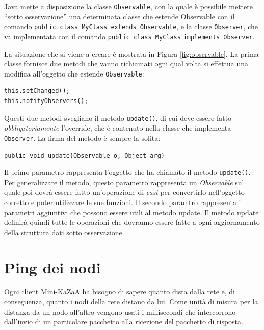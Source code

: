 Java mette a disposizione la classe \verb|Observable|,%
con la quale è possibile mettere ``sotto osservazione'' una determinata classe che estende Observable con il comando \verb|public class MyClass extends Observable|, e la classe \verb|Observer|, che va implementata con il comando \verb|public class MyClass| \verb|implements Observer|.

La situazione che si viene a creare è mostrata in Figura \ref{fig:observable}.
La prima classe fornisce due metodi che vanno richiamati ogni qual volta si effettua una modifica all'oggetto che estende \verb|Observable|:
\begin{lstlisting}
this.setChanged();
this.notifyObservers();
\end{lstlisting}
Questi due metodi svegliano il metodo \verb|update()|, di cui deve essere fatto \emph{obbligatoriamente} l'override, che è contenuto nella classe che implementa \verb|Observer|.
La firma del metodo è sempre la solita:
\begin{lstlisting}
public void update(Observable o, Object arg)
\end{lstlisting}
Il primo parametro rappresenta l'oggetto che ha chiamato il metodo \verb|update()|. Per generalizzare il metodo,
questo parametro rappresenta un \emph{Observable} sul quale poi dovrà essere fatto un'operazione di \emph{cast}
per convertirlo nell'oggetto corretto e poter utilizzare le sue funzioni. Il secondo paramtro rappresenta i parametri aggiuntivi che possono essere utili al metodo update.
Il metodo update definirà quindi tutte le operazioni che dovranno essere fatte a ogni aggiornamento della struttura dati sotto osservazione.

\section{Ping dei nodi}\label{sec:ping}
Ogni client Mini-KaZaA ha bisogno di sapere quanto dista dalla rete e, di conseguenza, quanto i nodi della rete distano da lui.
Come unità di misura per la distanza da un nodo all'altro vengono usati i millisecondi che intercorrono dall'invio di un particolare pacchetto alla ricezione del pacchetto di risposta.

